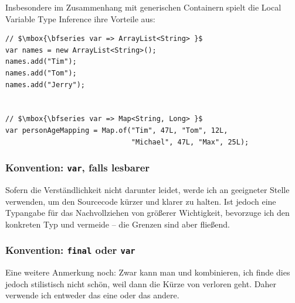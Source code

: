 \noindent
Insbesondere im Zusammenhang mit generischen Containern spielt die
Local Variable Type Inference ihre Vorteile aus:


\lstset{mathescape=true}
\vspace{-0.85mm}
\begin{lstlisting}
// $\mbox{\bfseries var => ArrayList<String> }$
var names = new ArrayList<String>();
names.add("Tim");
names.add("Tom");
names.add("Jerry");


// $\mbox{\bfseries var => Map<String, Long> }$
var personAgeMapping = Map.of("Tim", 47L, "Tom", 12L,
                              "Michael", 47L, "Max", 25L);
\end{lstlisting}
\vspace{-0.85mm}
\lstset{mathescape=false}


\subsubsection{Konvention: \texttt{var}, falls lesbarer}
Sofern die Verständlichkeit nicht darunter  leidet, werde ich 
an geeigneter Stelle verwenden, um den Sourcecode kürzer und
klarer zu halten. Ist jedoch eine Typangabe für das Nachvollziehen
von größerer Wichtigkeit, bevorzuge ich den konkreten Typ und
 vermeide  -- die Grenzen sind aber fließend.


\subsubsection{Konvention: \texttt{final} oder \texttt{var}}
Eine weitere  Anmerkung noch: Zwar kann man  und 
kombinieren, ich finde dies jedoch stilistisch nicht schön, weil dann die
Kürze von  verloren geht. Daher verwende ich
entweder das eine oder das andere.








